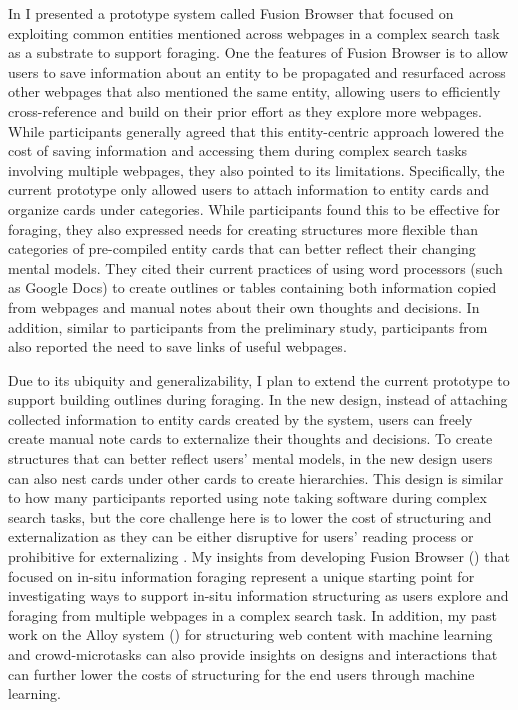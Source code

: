 In  I presented a prototype system called Fusion Browser that focused on exploiting common entities mentioned across webpages in a complex search task as a substrate to support foraging. One the features of Fusion Browser is to allow users to save information about an entity to be propagated and resurfaced across other webpages that also mentioned the same entity, allowing users to efficiently cross-reference and build on their prior effort as they explore more webpages. While participants generally agreed that this entity-centric approach lowered the cost of saving information and accessing them during complex search tasks involving multiple webpages, they also pointed to its limitations. Specifically, the current prototype only allowed users to attach information to entity cards and organize cards under categories. While participants found this to be effective for foraging, they also expressed needs for creating structures more flexible than categories of pre-compiled entity cards that can better reflect their changing mental models. They cited their current practices of using word processors (such as Google Docs) to create outlines or tables containing both information copied from webpages and manual notes about their own thoughts and decisions. In addition, similar to participants from the preliminary study, participants from  also reported the need to save links of useful webpages.

Due to its ubiquity and generalizability, I plan to extend the current prototype to support building outlines during foraging. In the new design, instead of attaching collected information to entity cards created by the system, users can freely create manual note cards to externalize their thoughts and decisions. To create structures that can better reflect users' mental models, in the new design users can also nest cards under other cards to create hierarchies. This design is similar to how many participants reported using note taking software during complex search tasks, but the core challenge here is to lower the cost of structuring and externalization as they can be either disruptive for users' reading process or prohibitive for externalizing \cite{o1996towards,marshall1999introducing,tashman2011liquidtext,bianchi2015designing}. My insights from developing Fusion Browser () that focused on in-situ information foraging represent a unique starting point for investigating ways to support in-situ information structuring as users explore and foraging from multiple webpages in a complex search task. In addition, my past work on the Alloy system () for structuring web content with machine learning and crowd-microtasks can also provide insights on designs and interactions that can further lower the costs of structuring for the end users through machine learning.


